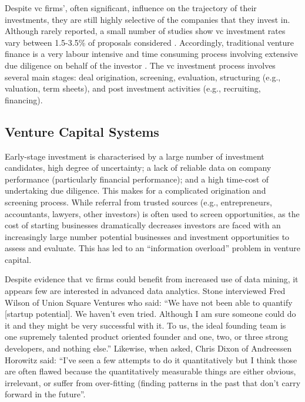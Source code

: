 \documentclass[../thesis/thesis.tex]{subfiles}
\begin{document}
Despite \gls{vc} firms', often significant, influence on the trajectory of their investments, they are still highly selective of the companies that they invest in. Although rarely reported, a small number of studies show \gls{vc} investment rates vary between 1.5-3.5\% of proposals considered \cite{stone2014}. Accordingly, traditional venture finance is a very labour intensive and time consuming process involving extensive due diligence on behalf of the investor \cite{fried1994}. The \gls{vc} investment process involves several main stages: deal origination, screening, evaluation, structuring (e.g., valuation, term sheets), and post investment activities (e.g., recruiting, financing).

\subsection{Venture Capital Systems}

Early-stage investment is characterised by a large number of investment candidates, high degree of uncertainty; a lack of reliable data on company performance (particularly financial performance); and a high time-cost of undertaking due diligence. This makes for a complicated origination and screening process. While referral from trusted sources (e.g., entrepreneurs, accountants, lawyers, other investors) is often used to screen opportunities, as the cost of starting businesses dramatically decreases investors are faced with an increasingly large number potential businesses and investment opportunities to assess and evaluate. This has led to an ``information overload'' problem in venture capital.

Despite evidence that \gls{vc} firms could benefit from increased use of data mining, it appears few are interested in advanced data analytics. Stone \cite{stone2014} interviewed Fred Wilson of Union Square Ventures who said: ``We have not been able to quantify [startup potential]. We haven't even tried. Although I am sure someone could do it and they might be very successful with it. To us, the ideal founding team is one supremely talented product oriented founder and one, two, or three strong developers, and nothing else.'' Likewise, when asked, Chris Dixon of Andreessen Horowitz said: ``I've seen a few attempts to do it quantitatively but I think those are often flawed because the quantitatively measurable things are either obvious, irrelevant, or suffer from over-fitting (finding patterns in the past that don't carry forward in the future''.
\end{document}
